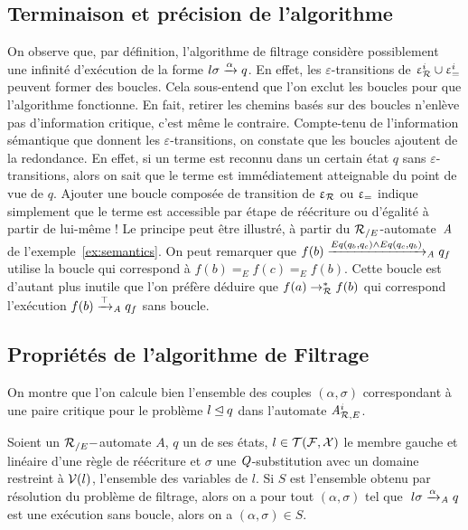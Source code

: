 \subsection{Terminaison et précision de l'algorithme}

On observe que, par définition, l'algorithme de filtrage considère possiblement
une infinité d'exécution de la forme $l\sigma \xrightarrow{\alpha} q$.
En effet, les $\varepsilon$-transitions de $\upvarepsilon_{\mathcal R}^i \cup \upvarepsilon_{=}^i$ peuvent former des boucles. 
Cela sous-entend que l'on exclut les boucles pour que l'algorithme fonctionne.
En fait, retirer les chemins basés sur des boucles n'enlève pas d'information
critique, c'est même le contraire. Compte-tenu de l'information sémantique 
que donnent les $\varepsilon$-transitions, on constate que les boucles ajoutent 
de la redondance. En effet, si un terme est reconnu dans un certain état $q$
sans $\varepsilon$-transitions, alors on sait que le terme est immédiatement atteignable 
du point de vue de $q$. Ajouter une boucle composée de transition de $\upvarepsilon_{\mathcal R}$ ou $\upvarepsilon_{=}$
indique simplement que le terme est accessible par étape de réécriture ou d'égalité
à partir de lui-même ! Le principe peut être illustré, à partir du ${\mathcal R_{/E}}$-automate~$\mathit A$
de l'exemple~\ref{ex:semantics}. On peut remarquer que $f(b) \xrightarrow{Eq(q_b, q_c)
  \land Eq(q_c, q_b)}_\mathit A q_f$ utilise la boucle qui correspond à $f(b) =_E f(c) =_E f(b)$. 
Cette boucle est d'autant plus inutile que l'on préfère déduire que $f(a) \rightarrow_\mathcal R^* f(b)$ 
qui correspond l'exécution $f(b) \xrightarrow{\top}_\mathit A q_f$ sans boucle.

\subsection{Propriétés de l'algorithme de Filtrage}

On montre que l'on calcule bien l'ensemble des couples $(\alpha,\sigma)$
correspondant à une paire critique pour le problème $l \unlhd q$ dans l'automate ${\mathit A}_{\mathcal R,E}^i$.

\begin{property}
  \label{prop:matching-complete}
  Soient un ${\mathcal R_{/E}}-$automate $A$, $q$ un de ses états, $l \in \mathcal{T(F, X)}$ le
  membre gauche et linéaire d'une règle de réécriture et $\sigma$ une
  $\mathit Q$-substitution avec un domaine restreint à $\mathcal V(l)$, l'ensemble des variables de $l$.  Si $S$
  est l'ensemble obtenu par résolution du problème de filtrage, alors on a pour
  tout $(\alpha, \sigma)$ tel que $\ l\sigma \xrightarrow{\alpha}_\mathit A q$ est une
  exécution sans boucle, alors on a $(\alpha, \sigma) \in S$.
\end{property}

